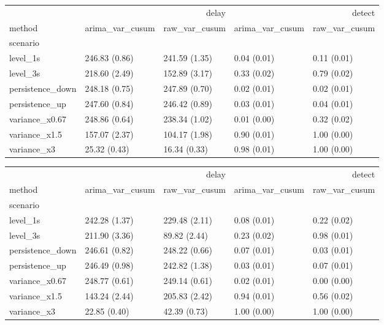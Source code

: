 \begin{tabular}{lllll}
\toprule
 & \multicolumn{2}{r}{delay} & \multicolumn{2}{r}{detect} \\
method & arima_var_cusum & raw_var_cusum & arima_var_cusum & raw_var_cusum \\
scenario &  &  &  &  \\
\midrule
level_1s & 246.83 (0.86) & 241.59 (1.35) & 0.04 (0.01) & 0.11 (0.01) \\
level_3s & 218.60 (2.49) & 152.89 (3.17) & 0.33 (0.02) & 0.79 (0.02) \\
persistence_down & 248.18 (0.75) & 247.89 (0.70) & 0.02 (0.01) & 0.02 (0.01) \\
persistence_up & 247.60 (0.84) & 246.42 (0.89) & 0.03 (0.01) & 0.04 (0.01) \\
variance_x0.67 & 248.86 (0.64) & 238.34 (1.02) & 0.01 (0.00) & 0.32 (0.02) \\
variance_x1.5 & 157.07 (2.37) & 104.17 (1.98) & 0.90 (0.01) & 1.00 (0.00) \\
variance_x3 & 25.32 (0.43) & 16.34 (0.33) & 0.98 (0.01) & 1.00 (0.00) \\
\bottomrule
\end{tabular}

\begin{tabular}{lllll}
\toprule
 & \multicolumn{2}{r}{delay} & \multicolumn{2}{r}{detect} \\
method & arima_var_cusum & raw_var_cusum & arima_var_cusum & raw_var_cusum \\
scenario &  &  &  &  \\
\midrule
level_1s & 242.28 (1.37) & 229.48 (2.11) & 0.08 (0.01) & 0.22 (0.02) \\
level_3s & 211.90 (3.36) & 89.82 (2.44) & 0.23 (0.02) & 0.98 (0.01) \\
persistence_down & 246.61 (0.82) & 248.22 (0.66) & 0.07 (0.01) & 0.03 (0.01) \\
persistence_up & 246.49 (0.98) & 242.82 (1.38) & 0.03 (0.01) & 0.07 (0.01) \\
variance_x0.67 & 248.77 (0.61) & 249.14 (0.61) & 0.02 (0.01) & 0.00 (0.00) \\
variance_x1.5 & 143.24 (2.44) & 205.83 (2.42) & 0.94 (0.01) & 0.56 (0.02) \\
variance_x3 & 22.85 (0.40) & 42.39 (0.73) & 1.00 (0.00) & 1.00 (0.00) \\
\bottomrule
\end{tabular}


